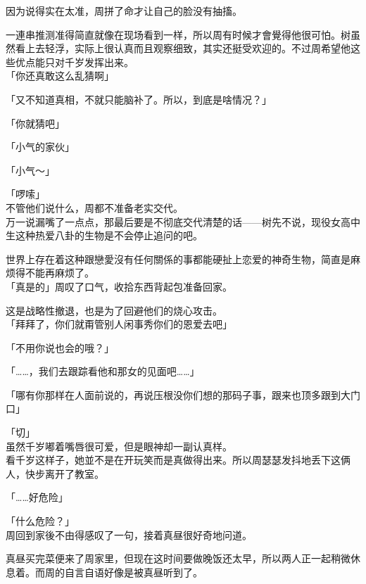 因为说得实在太准，周拼了命才让自己的脸没有抽搐。

一連串推测准得简直就像在现场看到一样，所以周有时候才會覺得他很可怕。树虽然看上去轻浮，实际上很认真而且观察细致，其实还挺受欢迎的。不过周希望他这些优点能只对千岁发挥出来。\\

「你还真敢这么乱猜啊」

「又不知道真相，不就只能脑补了。所以，到底是啥情况？」

「你就猜吧」

「小气的家伙」

「小气～」

「啰嗦」\\

不管他们说什么，周都不准备老实交代。\\

万一说漏嘴了一点点，那最后要是不彻底交代清楚的话——树先不说，现役女高中生这种热爱八卦的生物是不会停止追问的吧。

世界上存在着这种跟戀愛沒有任何關係的事都能硬扯上恋爱的神奇生物，简直是麻烦得不能再麻烦了。\\

「真是的」周叹了口气，收拾东西背起包准备回家。

这是战略性撤退，也是为了回避他们的烧心攻击。\\

「拜拜了，你们就甭管别人闲事秀你们的恩爱去吧」

「不用你说也会的哦？」

「……，我们去跟踪看他和那女的见面吧……」

「哪有你那样在人面前说的，再说压根没你们想的那码子事，跟来也顶多跟到大门口」

「切」\\

虽然千岁嘟着嘴唇很可爱，但是眼神却一副认真样。\\

看千岁这样子，她並不是在开玩笑而是真做得出来。所以周瑟瑟发抖地丢下这俩人，快步离开了教室。\\

\vspace{2\baselineskip}

「……好危险」

「什么危险？」\\

周回到家後不由得感叹了一句，接着真昼很好奇地问道。

真昼买完菜便来了周家里，但现在这时间要做晚饭还太早，所以两人正一起稍微休息着。而周的自言自语好像是被真昼听到了。\\

